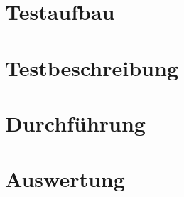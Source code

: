 \documentclass{article}%
\begin{document}
\section{Testaufbau}%
\label{sec:Testaufbau}%

%
\newpage%
\section{Testbeschreibung}%
\label{sec:Testbeschreibung}%

%
\newpage%
\section{Durchführung}%
\label{sec:Durchfhrung}%

%
\newpage%
\section{Auswertung}%
\label{sec:Auswertung}%

%
\newpage%
\newpage%
\newpage \listoffigures \newpage \listoftables%
\end{document}
